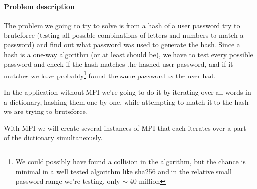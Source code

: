 \documentclass{article}
\begin{document}
\paragraph{Problem description}
The problem we going to try to solve is from a hash of a user password try to
bruteforce (testing all possible combinations of letters and numbers to match a
password) and find out what password was used to generate the hash.  Since a
hash is a one-way algorithm (or at least should be), we have to test every
possible password and check if the hash matches the hashed user password, and
if it matches we have probably\footnote{We could possibly have found a
collision in the algorithm, but the chance is minimal in a well tested
algorithm like sha256 and in the relative small password range we're testing,
only $\sim$ 40 million } found the same password as the user had.

In the application without MPI we're going to do it by iterating over all words
in a dictionary, hashing them one by one, while attempting to match it to the hash
we are trying to bruteforce.

With MPI we will create several instances of MPI that each iterates over a part
of the dictionary simultaneously.
\end{document}
